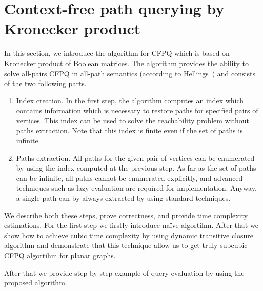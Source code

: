 \section{Context-free path querying by Kronecker product}


In this section, we introduce the algorithm for CFPQ which is based on Kronecker product of Boolean matrices. 
The algorithm provides the ability to solve all-pairs CFPQ in all-path semantics (according to Hellings~\cite{!!!}) and consists of the two following parts. 
\begin{enumerate}
\item Index creation. In the first step, the algorithm computes an index which contains information which is necessary to restore paths for specified pairs of vertices. This index can be used to solve the reachability problem without paths extraction. Note that this index is finite even if the set of paths is infinite.
\item Paths extraction. All paths for the given pair of vertices can be enumerated by using the index computed at the previous step. As far as the set of paths can be infinite, all paths cannot be enumerated explicitly, and advanced techniques such as lazy evaluation are required for implementation. Anyway, a single path can by always extracted by using standard techniques.
\end{enumerate}

We describe both these steps, prove correctness, and provide time complexity estimations. 
For the first step we firstly introduce na{\"i}ve algortihm. After that we show how to achieve cubic time complexity by using dynamic transitive closure algorithm and demonstrate that this technique allow us to get truly subcubic CFPQ algortihm for planar graphs.

After that we provide step-by-step example of query evaluation by using the proposed algorithm.




